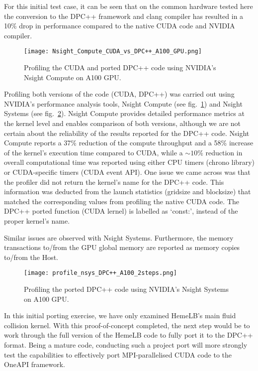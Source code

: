 \documentclass[../main]{subfiles}
\begin{document}
For this initial test case, it can be seen that on the common hardware tested here the conversion to the DPC++ framework and clang compiler has resulted in a 10\% drop in performance compared to the native CUDA code and NVIDIA compiler.

\begin{figure}[htp]
	\centering
	\texttt{[image: Nsight\_Compute\_CUDA\_vs\_DPC++\_A100\_GPU.png]}
	\caption{Profiling the CUDA and ported DPC++ code using NVIDIA's Nsight Compute on A100 GPU.}
	\label{fig:ncu_CUDA_Vs_DPC++_A100GPU}
\end{figure}

Profiling both versions of the code (CUDA, DPC++) was carried out using NVIDIA's performance analysis tools, Nsight Compute (see fig.~\ref{fig:ncu_CUDA_Vs_DPC++_A100GPU}) and Nsight Systems (see fig.~\ref{fig:nsys_DPC++_A100GPU}).
Nsight Compute provides detailed performance metrics at the kernel level and enables comparison of both versions, although we are not certain about the reliability of the results reported for the DPC++ code.
Nsight Compute reports a 37\% reduction of the compute throughput and a 58\% increase of the kernel's execution time compared to CUDA, while a $\sim10\%$ reduction in overall computational time was reported using either CPU timers (chrono library) or CUDA-specific timers (CUDA event API).
One issue we came across was that the profiler did not return the kernel's name for the DPC++ code.
This information was deducted from the launch statistics (gridsize and blocksize) that matched the corresponding values from profiling the native CUDA code.
The DPC++ ported function (CUDA lernel) is labelled as `const:', instead of the proper kernel's name.


Similar issues are observed with Nsight Systems.
Furthermore, the memory transactions to/from the GPU global memory are reported as memory copies to/from the Host.


\begin{figure}[htp]
	\centering
	\texttt{[image: profile\_nsys\_DPC++\_A100\_2steps.png]}
	\caption{Profiling the ported DPC++ code using NVIDIA's Nsight Systems on A100 GPU.}
	\label{fig:nsys_DPC++_A100GPU}
\end{figure}

In this initial porting exercise, we have only examined HemeLB's main fluid collision kernel.
With this proof-of-concept completed, the next step would be to work through the full version of the HemeLB code to fully port it to the DPC++ format.
Being a mature code, conducting such a project port will more strongly test the capabilities to effectively port MPI-parallelised CUDA code to the OneAPI framework.
\end{document}
